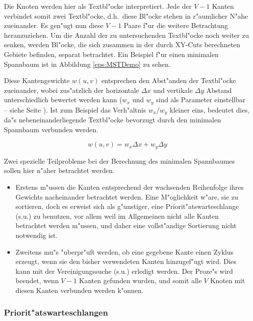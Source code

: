 Die Knoten werden hier als Textbl"ocke interpretiert. Jede der $V-1$ Kanten verbindet somit
zwei Textbl"ocke, d.h.\ diese Bl"ocke stehen in r"aumlicher N"ahe zueinander. Es gen"ugt nun
diese $V-1$ Paare f"ur die weitere Betrachtung heranzuziehen.
Um die Anzahl der zu untersuchenden Textbl"ocke noch weiter zu senken, werden
Bl"ocke, die sich zusammen in der durch XY-Cuts berechneten Gebiete befinden,
separat betrachtet. Ein Beispiel f"ur einen minimalen Spannbaum ist in
Abbildung \ref{eps:MSTDemo} zu sehen.


Diese Kantengewichte $w(u,v)$ entsprechen den Abst"anden der Textbl"ocke zueinander, wobei
zus"atzlich der horizontale $\Delta x$ und vertikale $\Delta y$ Abstand unterschiedlich
bewertet werden kann ($w_x$ und $w_y$ sind als Parameter einstellbar -- siehe
 Seite \pageref{eps:ParameterPanelMerge}).
Ist zum Beispiel das Verh"altnis $w_x / w_y$ kleiner eins,
bedeutet dies, da"s nebeneinanderliegende Textbl"ocke bevorzugt durch den minimalen
Spannbaum verbunden werden.

$$w(u,v) = w_x \Delta x + w_y \Delta y$$


Zwei spezielle Teilprobleme bei der Berechnung des minimalen Spannbaumes sollen hier n"aher
betrachtet werden.
\begin{itemize}
  \item
        Erstens m"ussen die Kanten entsprechend der wachsenden Reihenfolge ihres Gewichts nacheinander
        betrachtet werden. Eine M"oglichkeit w"are, sie zu sortieren, doch es erweist sich als
        g"unstiger, eine Priorit"atswarteschlange (s.u.) zu benutzen, vor allem weil im Allgemeinen nicht
        alle Kanten betrachtet werden m"ussen, und daher eine vollst"andige Sortierung nicht
        notwendig ist.
  \item
        Zweitens mu"s "uberpr"uft werden, ob eine gegebene Kante einen Zyklus erzeugt, wenn sie den bisher
        verwendeten Kanten hinzugef"ugt wird. Dies kann mit der Vereinigungssuche (s.u.) erledigt werden.
        Der Proze"s wird beendet, wenn $V-1$ Kanten gefunden wurden, und somit alle $V$ Knoten mit diesen
        Kanten verbunden werden k"onnen.
\end{itemize}

\subsubsection{Priorit"atswarteschlangen}

